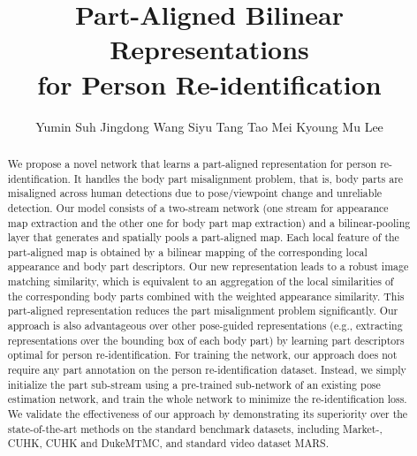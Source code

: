 \documentclass{llncs}
\begin{document}
\pagestyle{headings}
\mainmatter
\def\ECCV18SubNumber{****}  

\title{Part-Aligned Bilinear Representations \\for Person Re-identification}

\author{Yumin Suh \quad Jingdong Wang \quad Siyu Tang \quad Tao Mei \quad Kyoung Mu Lee}

\maketitle

\begin{abstract}
We propose a novel network that learns a part-aligned representation for person re-identification. It handles the body part misalignment problem, that is, body parts are misaligned across human detections due to pose/viewpoint change and unreliable detection. Our model consists of a two-stream network (one stream for appearance map extraction and the other one for body part map extraction) and a bilinear-pooling layer that generates and spatially pools a part-aligned map. Each local feature of the part-aligned map is obtained by a bilinear mapping of the corresponding local appearance and body part descriptors. Our new representation leads to a robust image matching similarity, which is equivalent to an aggregation of the local similarities of the corresponding body parts combined with the weighted appearance similarity. This part-aligned representation reduces the part misalignment problem significantly. Our approach is also advantageous over other pose-guided representations (e.g., extracting representations over the bounding box of each body part) by learning part descriptors optimal for person re-identification. For training the network, our approach does not require any part annotation on the person re-identification dataset. Instead, we simply initialize the part sub-stream using a pre-trained sub-network of an existing pose estimation network, and train the whole network to minimize the re-identification loss. We validate the effectiveness of our approach by demonstrating its superiority over the state-of-the-art methods on the standard benchmark datasets, including Market-, CUHK, CUHK and DukeMTMC, and standard video dataset MARS.
\end{abstract}
\end{document}
